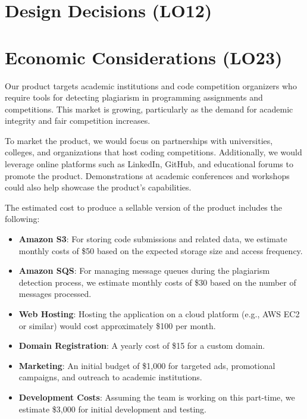 \documentclass{article}
\begin{document}

\section{Design Decisions (LO12)}


\section{Economic Considerations (LO23)}

Our product targets academic institutions and code competition organizers who require tools for detecting plagiarism in programming assignments and competitions. This market is growing, particularly as the demand for academic integrity and fair competition increases.

To market the product, we would focus on partnerships with universities, colleges, and organizations that host coding competitions. Additionally, we would leverage online platforms such as LinkedIn, GitHub, and educational forums to promote the product. Demonstrations at academic conferences and workshops could also help showcase the product's capabilities.

The estimated cost to produce a sellable version of the product includes the following:

\begin{itemize}
    \item \textbf{Amazon S3}: For storing code submissions and related data, we estimate monthly costs of \$50 based on the expected storage size and access frequency.
    \item \textbf{Amazon SQS}: For managing message queues during the plagiarism detection process, we estimate monthly costs of \$30 based on the number of messages processed.
    \item \textbf{Web Hosting}: Hosting the application on a cloud platform (e.g., AWS EC2 or similar) would cost approximately \$100 per month.
    \item \textbf{Domain Registration}: A yearly cost of \$15 for a custom domain.
    \item \textbf{Marketing}: An initial budget of \$1,000 for targeted ads, promotional campaigns, and outreach to academic institutions.
    \item \textbf{Development Costs}: Assuming the team is working on this part-time, we estimate \$3,000 for initial development and testing.
\end{itemize}
\end{document}

